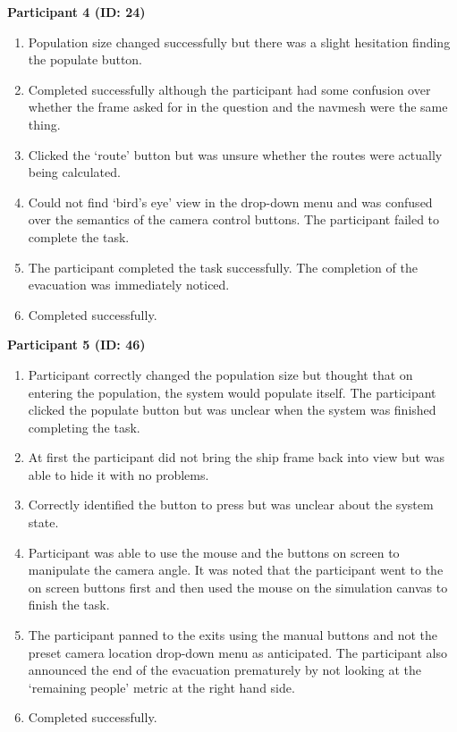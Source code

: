 \textbf{Participant 4 (ID: 24)}
\begin{enumerate}
\item Population size changed successfully but there was a slight hesitation finding the populate button.
\item Completed successfully although the participant had some confusion over whether the frame asked for in the question and the navmesh were the same thing.
\item Clicked the ‘route’ button but was unsure whether the routes were actually being calculated.
\item Could not find ‘bird’s eye’ view in the drop-down menu and was confused over the semantics of the camera control buttons. The participant failed to complete the task.
\item The participant completed the task successfully. The completion of the evacuation was immediately noticed.
\item Completed successfully.
\end{enumerate}

\textbf{Participant 5 (ID: 46)}
\begin{enumerate}
\item Participant correctly changed the population size but thought that on entering the population, the system would populate itself. The participant clicked the populate button but was unclear when the system was finished completing the task.
\item At first the participant did not bring the ship frame back into view but was able to hide it with no problems.
\item Correctly identified the button to press but was unclear about the system state.
\item Participant was able to use the mouse and the buttons on screen to manipulate the camera angle. It was noted that the participant went to the on screen buttons first and then used the mouse on the simulation canvas to finish the task.
\item The participant panned to the exits using the manual buttons and not the preset camera location drop-down menu as anticipated. The participant also announced the end of the evacuation prematurely by not looking at the ‘remaining people’ metric at the right hand side.
\item Completed successfully.
\end{enumerate}

